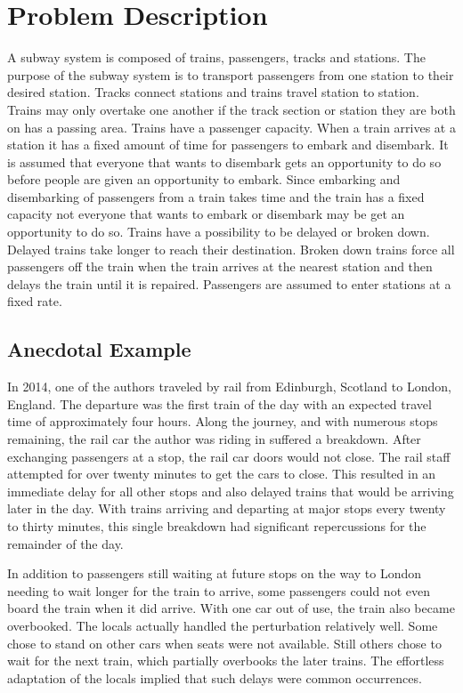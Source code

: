 \section{Problem Description}

A subway system is composed of trains, passengers, tracks and stations. The
purpose of the subway system is to transport passengers from one station to
their desired station. Tracks connect stations and trains travel station to
station. Trains may only overtake one another if the track section or station
they are both on has a passing area. Trains have a passenger capacity. When a
train arrives at a station it has a fixed amount of time for passengers to
embark and disembark. It is assumed that everyone that wants to disembark gets
an opportunity to do so before people are given an opportunity to embark. Since
embarking and disembarking of passengers from a train takes time and the train
has a fixed capacity not everyone that wants to embark or disembark may be get
an opportunity to do so. Trains have a possibility to be delayed or broken down.
Delayed trains take longer to reach their destination. Broken down trains force
all passengers off the train when the train arrives at the nearest station and
then delays the train until it is repaired. Passengers are assumed to enter
stations at a fixed rate.

\subsection{Anecdotal Example}

In 2014, one of the authors traveled by rail from Edinburgh, Scotland to London,
England.  The departure was the first train of the day with an expected travel
time of approximately four hours. Along the journey, and with numerous stops
remaining, the rail car the author was riding in suffered a breakdown.  After
exchanging passengers at a stop, the rail car doors would not close.  The rail
staff attempted for over twenty minutes to get the cars to close.  This resulted
in an immediate delay for all other stops and also delayed trains that would be
arriving later in the day.  With trains arriving and departing at major stops
every twenty to thirty minutes, this single breakdown had significant
repercussions for the remainder of the day. 

In addition to passengers still waiting at future stops on the way to London
needing to wait longer for the train to arrive, some passengers could not even
board the train when it did arrive.  With one car out of use, the train also
became overbooked.  The locals actually handled the perturbation relatively
well.  Some chose to stand on other cars when seats were not available.  Still
others chose to wait for the next train, which partially overbooks the later
trains.  The effortless adaptation of the locals implied that such delays were
common occurrences.

